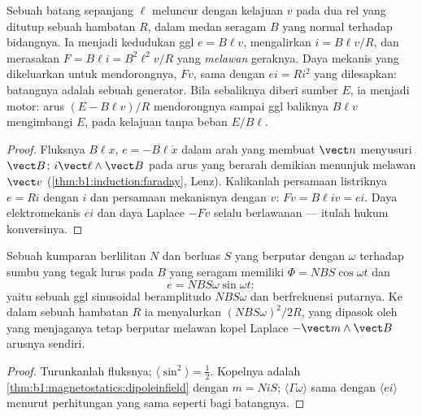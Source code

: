 \begin{proposition}\label{prop:b1:induction:rails}
Sebuah batang sepanjang $\ell$ meluncur dengan kelajuan $v$ pada dua rel yang ditutup
sebuah hambatan $R$, dalam medan seragam $B$ yang normal terhadap bidangnya. Ia menjadi
kedudukan ggl $e = B\ell v$, mengalirkan $i = B\ell v/R$, dan merasakan
 $F = B\ell i = B^2\ell^2v/R$ yang \emph{melawan} geraknya.
Daya mekanis yang dikeluarkan untuk mendorongnya, $Fv$, sama dengan 
$ei = Ri^2$ yang dilesapkan: batangnya adalah sebuah generator. Bila sebaliknya diberi
sumber $E$, ia menjadi motor: arus $(E - B\ell v)/R$ mendorongnya
sampai ggl baliknya $B\ell v$ mengimbangi $E$, pada kelajuan tanpa beban $E/B\ell$.
\end{proposition}

\begin{proof}
Fluksnya $B\ell x$, $e = -B\ell\dot x$ dalam arah yang membuat $\vect n$
menyusuri $\vect B$;  $i\vect\ell\wedge\vect B$ pada arus
yang berarah demikian menunjuk melawan $\vect v$ (\cref{thm:b1:induction:faraday},
Lenz). Kalikanlah persamaan listriknya $e = Ri$ dengan $i$ dan persamaan
mekanisnya dengan $v$: $Fv = B\ell iv = ei$. Daya elektromekanis
$ei$ dan daya Laplace $-Fv$ selalu berlawanan --- itulah hukum
konversinya.
\end{proof}

\begin{proposition}\label{prop:b1:induction:alternator}
Sebuah kumparan berlilitan $N$ dan berluas $S$ yang berputar dengan $\omega$ terhadap sumbu
yang tegak lurus pada $B$ yang seragam memiliki $\Phi = NBS\cos\omega t$ dan
\[
e = NBS\omega\sin\omega t :
\]
yaitu sebuah ggl sinusoidal beramplitudo $NBS\omega$ dan berfrekuensi putarnya.
Ke dalam sebuah hambatan $R$ ia menyalurkan  $(NBS\omega)^2/2R$,
yang dipasok oleh  yang menjaganya tetap berputar melawan kopel
Laplace $-\vect m\wedge\vect B$ arusnya sendiri.
\end{proposition}

\begin{proof}
Turunkanlah fluksnya; $\langle\sin^2\rangle = \tfrac12$. Kopelnya adalah
\cref{thm:b1:magnetostatics:dipoleinfield} dengan $m = Ni S$;  $\langle\Gamma\omega\rangle$ sama dengan $\langle ei\rangle$ menurut perhitungan
yang sama seperti bagi batangnya.
\end{proof}

